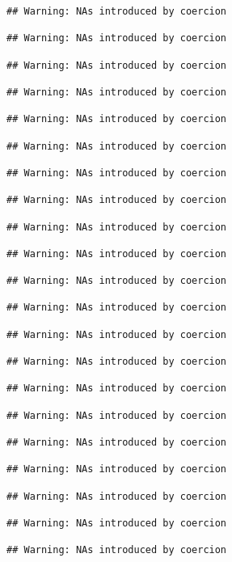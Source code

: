 \documentclass[]{article}
\begin{document}
\begin{verbatim}
## Warning: NAs introduced by coercion

## Warning: NAs introduced by coercion

## Warning: NAs introduced by coercion

## Warning: NAs introduced by coercion

## Warning: NAs introduced by coercion

## Warning: NAs introduced by coercion

## Warning: NAs introduced by coercion

## Warning: NAs introduced by coercion

## Warning: NAs introduced by coercion

## Warning: NAs introduced by coercion

## Warning: NAs introduced by coercion

## Warning: NAs introduced by coercion

## Warning: NAs introduced by coercion

## Warning: NAs introduced by coercion

## Warning: NAs introduced by coercion

## Warning: NAs introduced by coercion

## Warning: NAs introduced by coercion

## Warning: NAs introduced by coercion

## Warning: NAs introduced by coercion

## Warning: NAs introduced by coercion

## Warning: NAs introduced by coercion
\end{verbatim}
\end{document}
